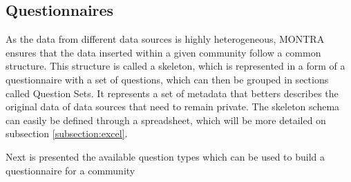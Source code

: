 \subsection{Questionnaires}


As the data from different data sources is highly heterogeneous, MONTRA ensures that the data inserted within a given community follow a common structure.
This structure is called a skeleton, which is represented in a form of a questionnaire with a set of questions, which can then be grouped in sections called Question Sets.
It represents a set of metadata that betters describes the original data of data sources that need to remain private.
The skeleton schema can easily be defined through a spreadsheet, which will be more detailed on subsection \ref{subsection:excel}.

Next is presented the available question types which can be used to build a questionnaire for a community

